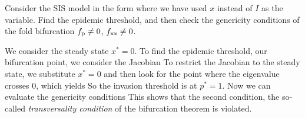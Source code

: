 Consider the SIS model in the form 
where we have used $x$ instead of $I$ as the variable. Find the epidemic threshold, and then check the genericity conditions of the 
fold bifurcation $f_{\rm p}\neq 0$, $f_{\rm xx}\neq 0$. 

\solution 
We consider the steady state $x^*=0$. To find the epidemic threshold, our bifurcation point, we consider the Jacobian 
To restrict the Jacobian to the steady state, we substitute $x^*=0$ and then look for the point where the eigenvalue crosses $0$, which yields
So the invasion threshold is at $p^*=1$. Now we can evaluate the genericity conditions
This shows that the second condition, the so-called \emph{transversality condition} of the bifurcation theorem is violated.  



